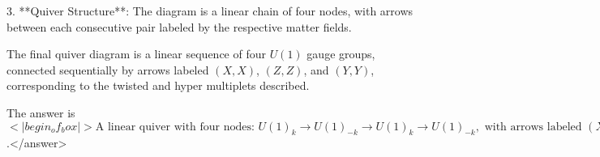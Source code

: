 3. **Quiver Structure**: The diagram is a linear chain of four nodes, with arrows between each consecutive pair labeled by the respective matter fields.  

The final quiver diagram is a linear sequence of four \( U(1) \) gauge groups, connected sequentially by arrows labeled \( (X, X) \), \( (Z, Z) \), and \( (Y, Y) \), corresponding to the twisted and hyper multiplets described.  

The answer is \(<|begin_of_box|>\text{A linear quiver with four nodes: } U(1)_k \to U(1)_{-k} \to U(1)_k \to U(1)_{-k}, \text{ with arrows labeled } (X,X), (Z,Z), (Y,Y) \text{ between consecutive nodes}<|end_of_box|>\).</answer>